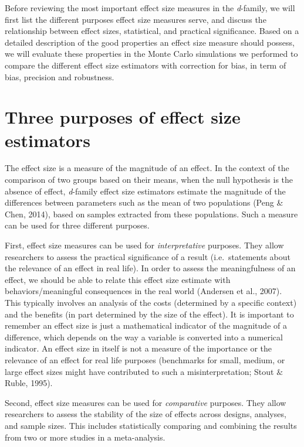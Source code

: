 \documentclass[
  english,
  man,floatsintext]{apa6}
\begin{document}
Before reviewing the most important effect size measures in the \emph{d}-family, we will first list the different purposes effect size measures serve, and discuss the relationship between effect sizes, statistical, and practical significance. Based on a detailed description of the good properties an effect size measure should possess, we will evaluate these properties in the Monte Carlo simulations we performed to compare the different effect size estimators with correction for bias, in term of bias, precision and robustness.

\hypertarget{three-purposes-of-effect-size-estimators}{%
\section{Three purposes of effect size estimators}\label{three-purposes-of-effect-size-estimators}}

\color{black}The effect size is a measure of the magnitude of an effect. In the context of the comparison of two groups based on their means, when the null hypothesis is the absence of effect, \emph{d}-family effect size estimators estimate the magnitude of the differences between parameters such as the mean of two populations (Peng \& Chen, 2014), based on samples extracted from these populations. Such a measure can be used for three different purposes.

First, effect size measures can be used for \emph{interpretative} purposes. They allow researchers to assess the practical significance of a result (i.e.~statements about the relevance of an effect in real life). In order to assess the meaningfulness of an effect, we should be able to relate this effect size estimate with behaviors/meaningful consequences in the real world (Andersen et al., 2007). This typically involves an analysis of the costs (determined by a specific context) and the benefits (in part determined by the size of the effect). It is important to remember an effect size is just a mathematical indicator of the magnitude of a difference, which depends on the way a variable is converted into a numerical indicator. An effect size in itself is not a measure of the importance or the relevance of an effect for real life purposes (benchmarks for small, medium, or large effect sizes might have contributed to such a misinterpretation; Stout
\(\&\) Ruble, 1995).

Second, effect size measures can be used for \emph{comparative} purposes. They allow researchers to assess the stability of the size of effects across designs, analyses, and sample sizes. This includes statistically comparing and combining the results from two or more studies in a meta-analysis.
\end{document}
